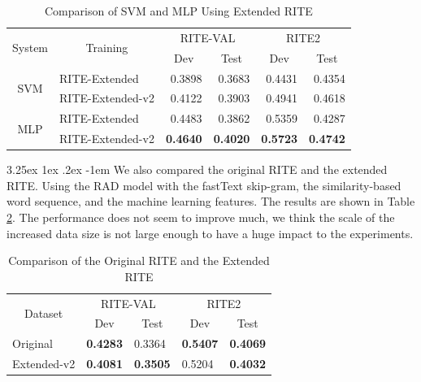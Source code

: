 \documentclass[12pt]{article}
\makeatletter
\renewcommand\paragraph{\@startsection{paragraph}{5}{\z@}%
  {3.25ex \@plus1ex \@minus.2ex}%
  {-1em}%
  {\normalfont\normalsize\bfseries}}
\makeatother
\begin{document}
\begin{CJK*}{UTF8}{bkai}
\begin{spacing}{1.77}
\begin{table}[H]
  \centering
  \setlength{\extrarowheight}{-3pt}
  \caption{Comparison of SVM and MLP Using Extended RITE}
  \label{result:ml_expand}
  \begin{tabular}{|c|l|r|r|r|r|}
  \hline
  \multirow{2}{*}{System} & \multicolumn{1}{c|}{\multirow{2}{*}{Training}} & \multicolumn{2}{c|}{RITE-VAL} & \multicolumn{2}{c|}{RITE2} \\ \cline{3-6}
   & \multicolumn{1}{c|}{} & \multicolumn{1}{c|}{Dev} & \multicolumn{1}{c|}{Test} & \multicolumn{1}{c|}{Dev} & \multicolumn{1}{c|}{Test} \\ \hline
  \multirow{2}{*}{SVM} & RITE-Extended & 0.3898 & 0.3683 & 0.4431 & 0.4354 \\ \cline{2-6}
   & RITE-Extended-v2 & 0.4122 & 0.3903 & 0.4941 & 0.4618 \\ \hline
  \multirow{2}{*}{MLP} & RITE-Extended & 0.4483 & 0.3862 & 0.5359 & 0.4287 \\ \cline{2-6}
   & RITE-Extended-v2 & \textbf{0.4640} & \textbf{0.4020} & \textbf{0.5723} & \textbf{0.4742} \\ \hline
  \end{tabular}
\end{table}

\paragraph{}
We also compared the original RITE and the extended RITE. Using the RAD model with the fastText skip-gram, the similarity-based word sequence, and the machine learning features. The results are shown in Table \ref{result:rite_extended}. The performance does not seem to improve much, we think the scale of the increased data size is not large enough to have a huge impact to the experiments.

\begin{table}[H]
  \centering
  \setlength{\extrarowheight}{-3pt}
  \caption{Comparison of the Original RITE and the Extended RITE}
  \label{result:rite_extended}
  \begin{tabular}{|l|l|l|l|l|}
  \hline
  \multicolumn{1}{|c|}{\multirow{2}{*}{Dataset}} & \multicolumn{2}{c|}{RITE-VAL} & \multicolumn{2}{c|}{RITE2} \\ \cline{2-5}
  \multicolumn{1}{|c|}{} & \multicolumn{1}{c|}{Dev} & \multicolumn{1}{c|}{Test} & \multicolumn{1}{c|}{Dev} & \multicolumn{1}{c|}{Test} \\ \hline
  Original & \textbf{0.4283} & 0.3364 & \textbf{0.5407} & \textbf{0.4069} \\ \hline
  Extended-v2 & \textbf{0.4081} & \textbf{0.3505} & 0.5204 & \textbf{0.4032} \\ \hline
  \end{tabular}
\end{table}


\end{spacing}
\end{CJK*}
\end{document}
